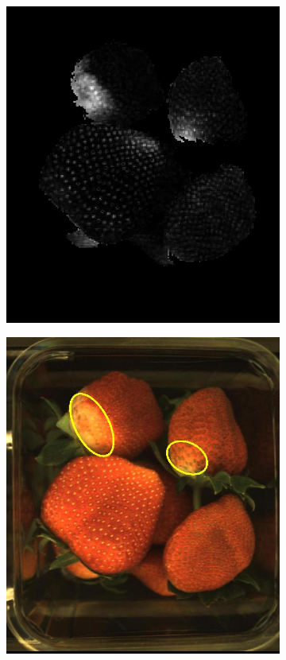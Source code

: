 \documentclass[fleqn,twoside,12pt]{report}
\begin{document}
\begin{figure}[ht]
\begin{subfigure}{.25\textwidth}
		\caption{}
		\label{fig:hsv}
	\end{subfigure}%
	\begin{subfigure}{.25\textwidth}
		\centering
		\includegraphics[width=.9\linewidth]{pow_image.jpg}
		\caption{}
		\label{fig:pow_image}
	\end{subfigure}%
	\begin{subfigure}{.25\textwidth}
		\centering
		\includegraphics[width=.9\linewidth]{result.jpg}
		\caption{}
		\label{fig:result}
	\end{subfigure}%
	

\end{figure}
\end{document}

